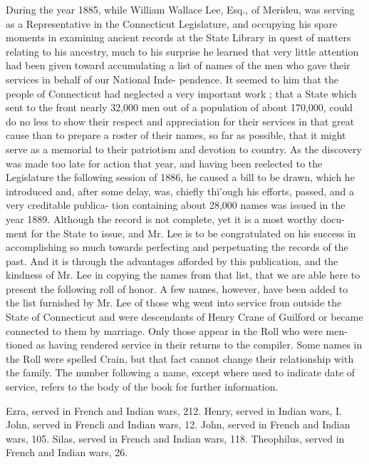 \documentclass{book}
\begin{document}
During the year 1885, while William Wallace Lee, Esq., of 
Merideu, was serving as a Representative in the Connecticut 
Legislature, and occupying his spare moments in examining 
ancient records at the State Library in quest of matters relating 
to his ancestry, much to his surprise he learned that very little 
attention had been given toward accumulating a list of names of 
the men who gave their services in behalf of our National Inde- 
pendence. It seemed to him that the people of Connecticut had 
neglected a very important work ; that a State which sent to 
the front nearly 32,000 men out of a population of about 
170,000, could do no less to show their respect and appreciation 
for their services in that great cause than to prepare a roster of 
their names, so far as possible, that it might serve as a memorial 
to their patriotism and devotion to country. As the discovery 
was made too late for action that year, and having been reelected 
to the Legislature the following session of 1886, he caused a bill 
to be drawn, which he introduced and, after some delay, was, 
chiefly thi'ough his efforts, passed, and a very creditable publica- 
tion containing about 28,000 names was issued in the year 1889. 
Although the record is not complete, yet it is a most worthy docu- 
ment for the State to issue, and Mr. Lee is to be congratulated 
on his success in accomplishing so much towards perfecting and 
perpetuating the records of the past. And it is through the 
advantages afforded by this publication, and the kindness of Mr. 
Lee in copying the names from that list, that we are able here to 
present the following roll of honor. A few names, however, 
have been added to the list furnished by Mr. Lee of those whg 
went into service from outside the State of Connecticut and were 
descendants of Henry Crane of Guilford or became connected to 
them by marriage. Only those appear in the Roll who were men- 
tioned as having rendered service in their returns to the compiler. 
Some names in the Roll were spelled Crain, but that fact cannot 
change their relationship with the family. The number following 
a name, except where used to indicate date of service, refers to 
the body of the book for further information. 

Ezra, served in French and Indian wars, 212. 
Henry, served in Indian wars, I. 
John, served in Frencli and Indian wars, 12. 
John, served in French and Indian wars, 105. 
Silas, served in French and Indian wars, 118. 
Theophilus, served in French and Indian wars, 26. 
\end{document}
